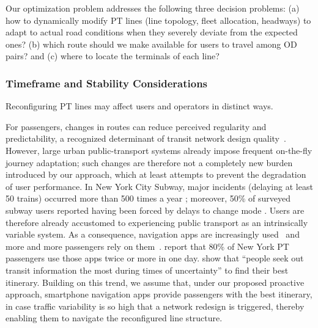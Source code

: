\documentclass[a4paper,fleqn]{cas-sc}
\begin{document}
Our optimization problem addresses the following three decision problems:
(a) how to dynamically modify PT lines (line topology, fleet allocation, headways) to adapt to actual road conditions when they severely deviate from the expected ones?
(b) which route should we make available for users to travel among OD pairs? and
(c) where to locate the terminals of each line?


\subsubsection{Timeframe and Stability Considerations}\label{sec:timeframe}
Reconfiguring PT lines may affect users and operators in distinct ways. 

For passengers, changes in routes can reduce perceived regularity and predictability, a recognized determinant of transit network design quality~\citep{vanoort2009regularity}. 
%
However, large urban public-transport systems already impose frequent on-the-fly journey adaptation; such changes are therefore not a completely new burden introduced by our approach, which at least attempts to prevent the degradation of user performance. In New York City Subway, major incidents (delaying at least 50 trains) occurred more than 500 times a year \citep[p.~2, ``Major Incidents''; p.~3, Fig.~3]{OSC2025SubwayDelays}; moreover, 50\% of surveyed subway users reported having been forced by delays to change mode \citep[p.~9]{NYCComptroller2017HumanCost}. Users are therefore already accustomed to experiencing public transport as an intrinsically variable system.
As a consequence, navigation apps are increasingly used~\citep {SmartphoneUse2016} and more and more passengers rely on them~\citep{durand2024digital}. \citet[p 147]{ghahramani2016trends} report that 80\% of New York PT passengers use those apps twice or more in one day. \cite{Shalaby2024} show that ``people seek out transit information the most during times of uncertainty'' to find their best itinerary.
Building on this trend, we assume that, under our proposed proactive approach, smartphone navigation apps provide passengers with the best itinerary, in case traffic variability is so high that a network redesign is triggered, thereby enabling them to navigate the reconfigured line structure.
\end{document}
